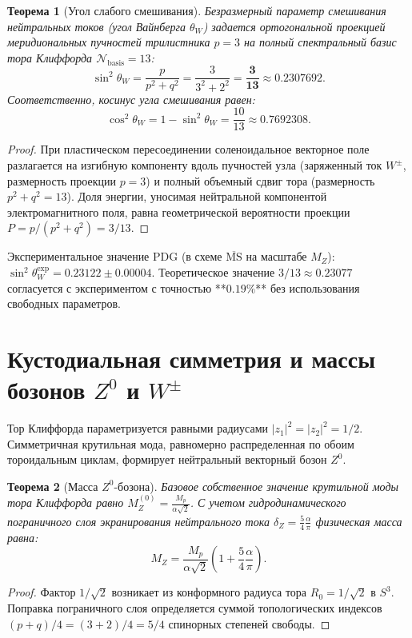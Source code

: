 \documentclass[11pt,a4paper]{article}
\newtheorem{theorem}{Теорема}
\theoremstyle{definition}
\theoremstyle{remark}
\begin{document}
\begin{theorem}[Угол слабого смешивания]
\label{thm:weinberg_angle}
Безразмерный параметр смешивания нейтральных токов (угол Вайнберга $\theta_W$) задается ортогональной проекцией меридиональных пучностей трилистника $p=3$ на полный спектральный базис тора Клиффорда $\mathcal{N}_{\mathrm{basis}} = 13$:
\begin{equation}
    \sin^2\theta_W = \frac{p}{p^2 + q^2} = \frac{3}{3^2 + 2^2} = \boldsymbol{\frac{3}{13}} \approx 0.2307692.
\end{equation}
Соответственно, косинус угла смешивания равен:
\begin{equation}
    \cos^2\theta_W = 1 - \sin^2\theta_W = \frac{10}{13} \approx 0.7692308.
\end{equation}
\end{theorem}
\begin{proof}
При пластическом пересоединении соленоидальное векторное поле разлагается на изгибную компоненту вдоль пучностей узла (заряженный ток $W^\pm$, размерность проекции $p=3$) и полный объемный сдвиг тора (размерность $p^2+q^2=13$). Доля энергии, уносимая нейтральной компонентой электромагнитного поля, равна геометрической вероятности проекции $P = p / (p^2+q^2) = 3/13$.
\end{proof}

Экспериментальное значение PDG (в схеме $\overline{\mathrm{MS}}$ на масштабе $M_Z$): $\sin^2\theta_W^{\mathrm{exp}} = 0.23122 \pm 0.00004$. Теоретическое значение $3/13 \approx 0.23077$ согласуется с экспериментом с точностью **$0.19\%$** без использования свободных параметров.

\section{Кустодиальная симметрия и массы бозонов $Z^0$ и $W^\pm$}
Тор Клиффорда параметризуется равными радиусами $|z_1|^2 = |z_2|^2 = 1/2$. Симметричная крутильная мода, равномерно распределенная по обоим тороидальным циклам, формирует нейтральный векторный бозон $Z^0$.

\begin{theorem}[Масса $Z^0$-бозона]
Базовое собственное значение крутильной моды тора Клиффорда равно $M_Z^{(0)} = \frac{M_p}{\alpha \sqrt{2}}$. С учетом гидродинамического пограничного слоя экранирования нейтрального тока $\delta_Z = \frac{5}{4}\frac{\alpha}{\pi}$ физическая масса равна:
\begin{equation}
    M_Z = \frac{M_p}{\alpha \sqrt{2}} \left( 1 + \frac{5}{4}\frac{\alpha}{\pi} \right).
\end{equation}
\end{theorem}
\begin{proof}
Фактор $1/\sqrt{2}$ возникает из конформного радиуса тора $R_0 = 1/\sqrt{2}$ в $S^3$. Поправка пограничного слоя определяется суммой топологических индексов $(p+q)/4 = (3+2)/4 = 5/4$ спинорных степеней свободы.
\end{proof}
\end{document}
